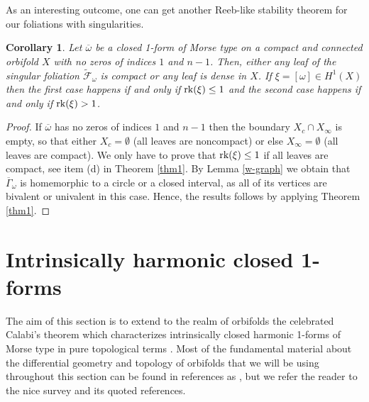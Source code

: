 \documentclass[
  a4paper, 
  reqno, 
  oneside, 
  12pt
]{amsart}
\newtheorem{corollary}[theorem]{Corollary}
\theoremstyle{definition}
\theoremstyle{remark}
\begin{document}
As an interesting outcome, one can get another Reeb-like stability theorem for our foliations with singularities.

\begin{corollary}\label{cor1}
Let $\overline{\omega}$ be a closed 1-form of Morse type on a compact and connected orbifold $X$ with no zeros of indices $1$ and $n-1$. Then, either 
any leaf of the singular foliation $\tilde{\mathcal{F}}_\omega$ is compact or any leaf is dense in $X$. If $\xi=[\omega]\in H^1(X)$ then the first case happens if and only if $\textnormal{rk}(\xi)\leq 1$ and the second case happens if and only if $\textnormal{rk}(\xi)>1$.
 \end{corollary}

\begin{proof}
If $\overline{\omega}$ has no zeros of indices $1$ and $n-1$ then the boundary $X_c\cap X_\infty$ is empty, so that either $X_c=\emptyset$ (all leaves are noncompact) or else $X_\infty=\emptyset$ (all leaves are compact). We only have to prove that $\textnormal{rk}(\xi)\leq 1$ if all leaves are compact, see item (d) in Theorem \ref{thm1}. By Lemma \ref{w-graph} we obtain that $\overline{\Gamma}_\omega$ is homemorphic to a circle or a closed interval, as all of its vertices are bivalent or 
univalent in this case. Hence, the results follows by applying Theorem \ref{thm1}.
\end{proof}

 


\section{Intrinsically harmonic closed 1-forms}\label{sec:4}

The aim of this section is to extend to the realm of orbifolds the celebrated Calabi's theorem which characterizes intrinsically closed harmonic 1-forms of Morse type in pure topological terms \cite{Calabi}. Most of the fundamental material about the differential geometry and topology of orbifolds that we will be using throughout this section can be found in references as \cite{AMR,FarProSea,KleinerLott}, but we refer the reader to the nice survey \cite{Caramello} and its quoted references. 
\end{document}
